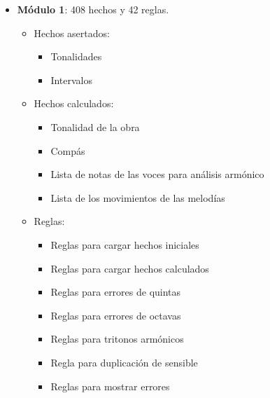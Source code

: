 \begin{itemize}

	\item \textbf{Módulo 1}: 408 hechos y 42 reglas.

	\begin{itemize}

		\item Hechos asertados:

			\begin{itemize}

				\item Tonalidades

				\item Intervalos

			\end{itemize}

		\item Hechos calculados:

			\begin{itemize}

				\item Tonalidad de la obra

				\item Compás

				\item Lista de notas de las voces para análisis armónico

				\item Lista de los movimientos de las melodías

			\end{itemize}

		\item Reglas:

			\begin{itemize}

				\item Reglas para cargar hechos iniciales

				\item Reglas para cargar hechos calculados

				\item Reglas para errores de quintas

				\item Reglas para errores de octavas

				\item Reglas para tritonos armónicos

				\item Regla para duplicación de sensible

				\item Reglas para mostrar errores


\end{itemize}
\end{itemize}
\end{itemize}

